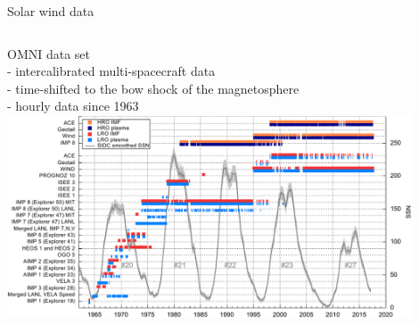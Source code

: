 \begin{frame}[plain,c]{Solar wind data}{}
	\begin{columns}[c]
	\column{\textwidth}
		
		OMNI data set \citep{King2005}\\
		- intercalibrated multi-spacecraft data\\
		- time-shifted to the bow shock of the magnetosphere\\
		- hourly data since 1963\\
		\centering
		\includegraphics[width=0.9\textwidth]{../figures_of_mine/gnuplots/timeline_OMNI_SC_IDs.pdf}
		
	\end{columns}
\end{frame}
